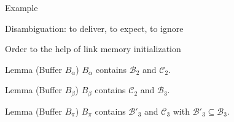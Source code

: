 \documentclass[10pt, xcolor={usenames, dvipsnames}]{beamer}
\begin{document}
\begin{frame}{Example}
\end{frame}

\begin{frame}{Disambiguation: to deliver, to expect, to ignore}
  
  \begin{adjustwidth}{-1.5em}{-1.5em}
    \begin{center}
    
    \end{center}

    
  \end{adjustwidth}

\end{frame}


\begin{frame}{Order to the help of link memory initialization}

  \begin{center}
    
  \end{center}

  \vspace{-1em}

  \begin{minipage}{0.325\textwidth}
    \begin{block}{Lemma (Buffer $B_\alpha$)}
      $B_\alpha$ contains $\mathcal{B}_2$ and $\mathcal{C}_2$.
    \end{block}
  \end{minipage}
  \begin{minipage}{0.325\textwidth}
    \begin{block}{Lemma (Buffer $B_\beta$)}
      $B_\beta$ contains $\mathcal{C}_2$ and $\mathcal{B}_3$.
    \end{block}
  \end{minipage}
  \begin{minipage}{0.325\textwidth}
    \begin{block}{Lemma (Buffer $B_\pi$)}
      $B_\pi$ contains $\mathcal{B'}_3$ and $\mathcal{C}_3$ with 
      $\mathcal{B}'_3 \subseteq \mathcal{B}_3$.
    \end{block}
  \end{minipage}
  

\end{frame}
\end{document}
